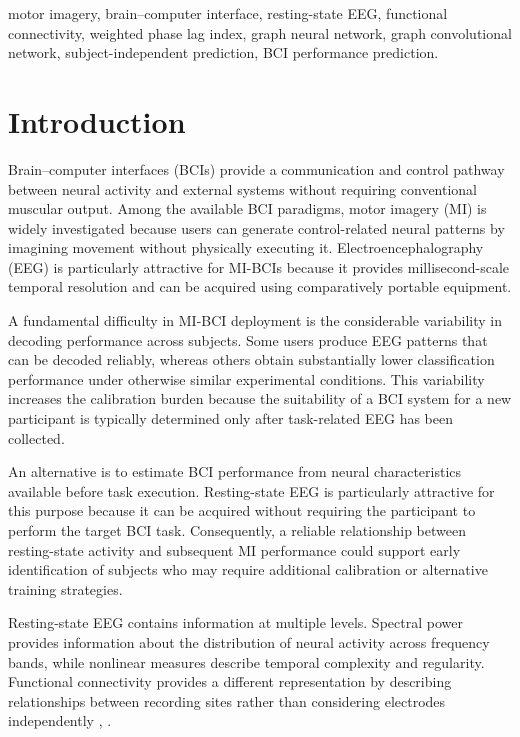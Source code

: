 \documentclass[conference]{IEEEtran}
\begin{document}
\begin{IEEEkeywords}
motor imagery, brain--computer interface, resting-state EEG, functional connectivity, weighted phase lag index, graph neural network, graph convolutional network, subject-independent prediction, BCI performance prediction.
\end{IEEEkeywords}

\section{Introduction}
Brain--computer interfaces (BCIs) provide a communication and control pathway between neural activity and external systems without requiring conventional muscular output. Among the available BCI paradigms, motor imagery (MI) is widely investigated because users can generate control-related neural patterns by imagining movement without physically executing it. Electroencephalography (EEG) is particularly attractive for MI-BCIs because it provides millisecond-scale temporal resolution and can be acquired using comparatively portable equipment.

A fundamental difficulty in MI-BCI deployment is the considerable variability in decoding performance across subjects. Some users produce EEG patterns that can be decoded reliably, whereas others obtain substantially lower classification performance under otherwise similar experimental conditions. This variability increases the calibration burden because the suitability of a BCI system for a new participant is typically determined only after task-related EEG has been collected.

An alternative is to estimate BCI performance from neural characteristics available before task execution. Resting-state EEG is particularly attractive for this purpose because it can be acquired without requiring the participant to perform the target BCI task. Consequently, a reliable relationship between resting-state activity and subsequent MI performance could support early identification of subjects who may require additional calibration or alternative training strategies.

Resting-state EEG contains information at multiple levels. Spectral power provides information about the distribution of neural activity across frequency bands, while nonlinear measures describe temporal complexity and regularity. Functional connectivity provides a different representation by describing relationships between recording sites rather than considering electrodes independently \cite{lachaux1999}, \cite{vinck2011}.
\end{document}

